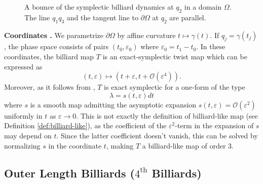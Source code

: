 \documentclass[10pt]{article}
\begin{document}
\begin{figure}[!ht]
\centering
{}
\caption{A bounce of the symplectic billiard dynamics at $q_2$ in a domain $\Omega$. The line $q_1q_3$ and the tangent line to $\partial\Omega$ at $q_2$ are parallel.}
\label{figure:symplectic_bounce}
\end{figure}


\medskip
\noindent\textbf{Coordinates \cite{AlbersTabachnikov,FierobeSorrentinoVig}.} 
We parametrize $\partial\Omega$ by affine curvature $t\mapsto\gamma(t)$. If $q_j = \gamma(t_j)$, the phase space consists of pairs $(t_0,\varepsilon_0)$ where $\varepsilon_0=t_1-t_0$. In these coordinates, the billiard map $T$ is an exact-symplectic twist map which can be expressed as
\[
(t, \varepsilon) \mapsto (t + \varepsilon, t + \mathcal{O}(\varepsilon^4)).
\]
Moreover, as it follows from \cite[Lemma 2.7]{AlbersTabachnikov}, $T$ is exact symplectic for a one-form of the type
\[
\lambda = s(t,\varepsilon)dt
\]
where $s$ is a smooth map admitting the asymptotic expansion $s(t,\varepsilon) = \mathcal O(\varepsilon^2)$ uniformly in $t$ as $\varepsilon\to 0$. This is not exactly the definition of billiard-like map (see Definition \ref{def:billiard-like}), as the coefficient of the $\varepsilon^2$-term in the expansion of $s$ may depend on $t$. Since the latter coefficient doesn't vanish, this can be solved by normalizing $s$ in the coordinate $t$, making $T$ a billiard-like map of order $3$.

\subsection{Outer Length Billiards ($4^{\text{th}}$ Billiards)}
\end{document}
